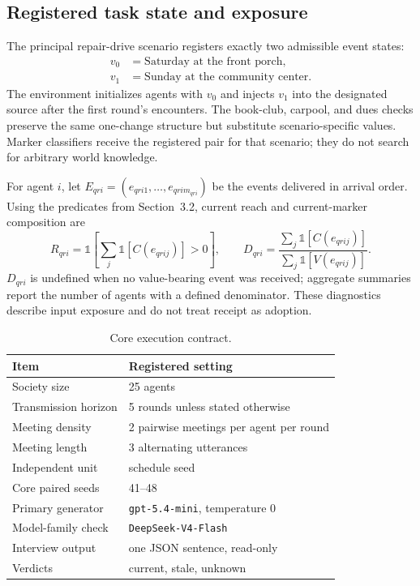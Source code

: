 \documentclass[sigconf,anonymous]{acmart}
\begin{document}
\subsection{Registered task state and exposure}
\label{app:exposure}

The principal repair-drive scenario registers exactly two admissible event states:
\[
  \begin{aligned}
  v_0 &= \text{Saturday at the front porch},\\
  v_1 &= \text{Sunday at the community center}.
  \end{aligned}
\]
The environment initializes agents with $v_0$ and injects $v_1$ into the designated source after
the first round's encounters.  The book-club, carpool, and dues checks preserve the same
one-change structure but substitute scenario-specific values.  Marker classifiers receive the
registered pair for that scenario; they do not search for arbitrary world knowledge.

For agent $i$, let $E_{qri}=(e_{qri1},\ldots,e_{qrim_{qri}})$ be the events delivered in arrival
order.  Using the predicates from Section~3.2, current reach and current-marker composition are
\[
 R_{qri}=\mathbb{1}\!\left[\sum_j\mathbb{1}[C(e_{qrij})]>0\right],
 \qquad
 D_{qri}=
 \frac{\sum_j\mathbb{1}[C(e_{qrij})]}
      {\sum_j\mathbb{1}[V(e_{qrij})]}.
\]
$D_{qri}$ is undefined when no value-bearing event was received; aggregate summaries report the
number of agents with a defined denominator.  These diagnostics describe input exposure and do
not treat receipt as adoption.

\begin{table}[!ht]
  \caption{Core execution contract.}
  \label{tab:app-contract}
  \centering
  \small
  \begin{tabular}{@{}ll@{}}
    \toprule
    Item & Registered setting \\
    \midrule
    Society size & 25 agents \\
    Transmission horizon & 5 rounds unless stated otherwise \\
    Meeting density & 2 pairwise meetings per agent per round \\
    Meeting length & 3 alternating utterances \\
    Independent unit & schedule seed \\
    Core paired seeds & 41--48 \\
    Primary generator & \texttt{gpt-5.4-mini}, temperature 0 \\
    Model-family check & \texttt{DeepSeek-V4-Flash} \\
    Interview output & one JSON sentence, read-only \\
    Verdicts & current, stale, unknown \\
    \bottomrule
  \end{tabular}
\end{table}
\end{document}
